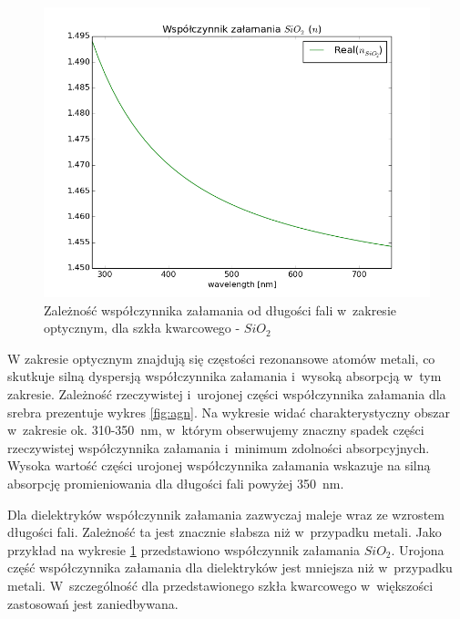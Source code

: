 \begin{figure}[tb]
	\includegraphics[width=\textwidth]{images/sio2n.png}
	\caption{Zależność współczynnika załamania od długości fali w~zakresie optycznym, dla szkła kwarcowego -  $SiO_2$ \cite{MALITSON:65}   }
	\label{fig:sio2n}
\end{figure}
W zakresie optycznym znajdują się częstości rezonansowe atomów metali, co skutkuje silną dyspersją współczynnika załamania i~wysoką absorpcją w~tym zakresie. Zależność rzeczywistej i~urojonej części współczynnika załamania  dla srebra prezentuje wykres \ref{fig:agn}. Na wykresie widać charakterystyczny obszar w~zakresie ok. 310-350~nm, w~którym obserwujemy znaczny spadek części rzeczywistej współczynnika załamania i~minimum zdolności absorpcyjnych. Wysoka wartość części urojonej współczynnika załamania wskazuje na silną absorpcję promieniowania dla długości fali powyżej 350~nm.

Dla dielektryków współczynnik załamania zazwyczaj maleje wraz ze wzrostem długości fali. Zależność ta jest znacznie słabsza niż w~przypadku metali. Jako przykład na wykresie \ref{fig:sio2n} przedstawiono współczynnik załamania $SiO_2$. Urojona część współczynnika załamania dla dielektryków jest mniejsza niż w~przypadku metali. W~szczególność dla przedstawionego szkła kwarcowego w~większości zastosowań jest zaniedbywana.

